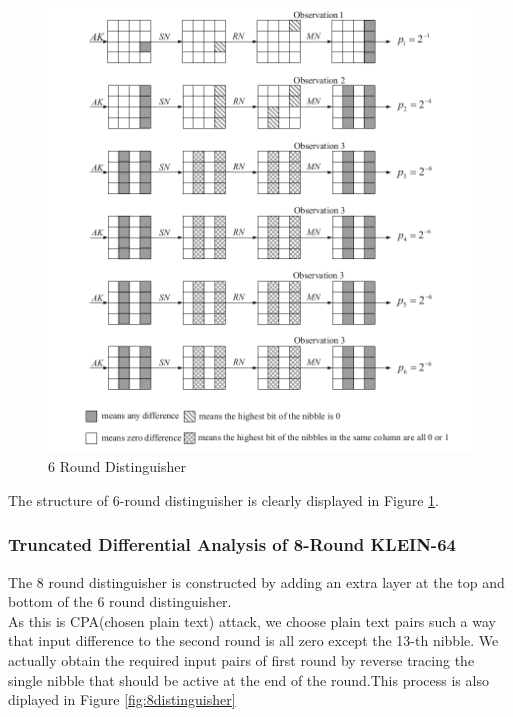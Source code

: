 \documentclass[preprint]{transcrypto}
\begin{document}
\begin{figure}
    \centering
    \includegraphics[width= \textwidth]{images/6roundattack.png}
    \caption{6 Round Distinguisher}
    \label{fig:6distinguisher}
\end{figure}
The structure of 6-round distinguisher is clearly displayed in Figure \ref{fig:6distinguisher}.\\
\subsubsection{Truncated Differential Analysis of 8-Round KLEIN-64}
The 8 round distinguisher is constructed by adding an extra layer at the top and bottom of the 6 round distinguisher.\\
As this is CPA(chosen plain text) attack, we choose plain text pairs such a way that input difference to the second round is all zero except the 13-th nibble. We actually obtain the required input pairs of first round by reverse tracing the single nibble that should be active at the end of the round.This process is also diplayed in Figure \ref{fig:8distinguisher} \\
\end{document}
